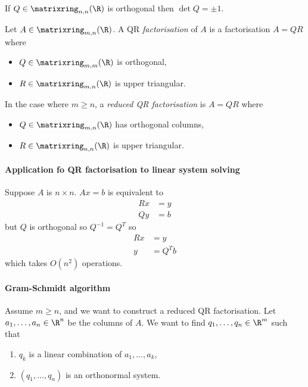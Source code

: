 \documentclass[a4paper]{article}
\begin{document}
\begin{remark}
  If \(Q \in \matrixring_{n, n}(\R)\) is orthogonal then \(\det Q = \pm 1\).
\end{remark}

\begin{definition}[QR factorisation]
  Let \(A \in \matrixring_{m, n}(\R)\). A QR \emph{factorisation} of \(A\) is a factorisation \(A = QR\) where
  \begin{itemize}
  \item \(Q \in \matrixring_{m, m}(\R)\) is orthogonal,
  \item \(R \in \matrixring_{m, n}(\R)\) is upper triangular.
  \end{itemize}

  In the case where \(m \geq n\), a \emph{reduced QR factorisation} is \(A = QR\) where
  \begin{itemize}
  \item \(Q \in \matrixring_{m, n}(\R)\) has orthogonal columns,
  \item \(R \in \matrixring_{n, n}(\R)\) is upper triangular.
  \end{itemize}
\end{definition}


\paragraph{Application fo QR factorisation to linear system solving}

Suppose \(A\) is \(n \times n\). \(Ax = b\) is equivalent to
\begin{align*}
  Rx &= y \\
  Qy &= b
\end{align*}
but \(Q\) is orthogonal so \(Q^{-1} = Q^T\) so
\begin{align*}
  Rx &= y \\
  y &= Q^Tb
\end{align*}
which takes \(O(n^2)\) operations.

\paragraph{Gram-Schmidt algorithm}

Assume \(m \geq n\), and we want to construct a reduced QR factorisation. Let \(a_1, \dots, a_n \in \R^n\) be the columns of \(A\). We want to find \(q_1, \dots, q_n \in \R^m\) such that
\begin{enumerate}
\item \(q_k\) is a linear combination of \(a_1, \dots, a_k\),
\item \((q_1, \dots, q_n)\) is an orthonormal system.
\end{enumerate}
\end{document}
